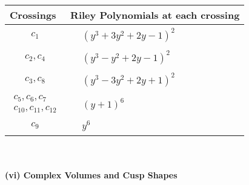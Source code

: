 \documentclass[1p]{elsarticle_modified}
\theoremstyle{definition}
\begin{document}
\begin{tabular}{m{50pt}|m{274pt}}
Crossings & \hspace{64pt}Riley Polynomials at each crossing \\
\hline $$\begin{aligned}c_{1}\end{aligned}$$&$\begin{aligned}
&(y^3+3 y^2+2 y-1)^2
\end{aligned}$\\
\hline $$\begin{aligned}c_{2},c_{4}\end{aligned}$$&$\begin{aligned}
&(y^3- y^2+2 y-1)^2
\end{aligned}$\\
\hline $$\begin{aligned}c_{3},c_{8}\end{aligned}$$&$\begin{aligned}
&(y^3-3 y^2+2 y+1)^2
\end{aligned}$\\
\hline $$\begin{aligned}c_{5},c_{6},c_{7}\\c_{10},c_{11},c_{12}\end{aligned}$$&$\begin{aligned}
&(y+1)^6
\end{aligned}$\\
\hline $$\begin{aligned}c_{9}\end{aligned}$$&$\begin{aligned}
&y^6
\end{aligned}$\\
\hline
\end{tabular}\\~\\
\newpage\flushleft \textbf{(vi) Complex Volumes and Cusp Shapes}
\end{document}
